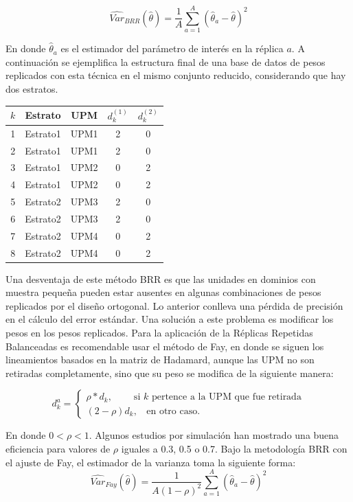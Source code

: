 \documentclass[
  12pt,
  spanish,
]{book}
\begin{document}
\[
\widehat{Var}_{BRR}(\hat{\theta}) = \frac{1}{A}\sum_{a=1}^A(\hat{\theta}_a - \hat\theta )^2
\]

En donde \(\hat{\theta}_a\) es el estimador del parámetro de interés en la réplica \(a\). A continuación se ejemplifica la estructura final de una base de datos de pesos replicados con esta técnica en el mismo conjunto reducido, considerando que hay dos estratos.

\begin{longtable}[]{@{}ccccc@{}}
\toprule
\(k\) & Estrato & UPM & \(d_k^{(1)}\) & \(d_k^{(2)}\) \\
\midrule
\endhead
1 & Estrato1 & UPM1 & 2 & 0 \\
2 & Estrato1 & UPM1 & 2 & 0 \\
3 & Estrato1 & UPM2 & 0 & 2 \\
4 & Estrato1 & UPM2 & 0 & 2 \\
5 & Estrato2 & UPM3 & 2 & 0 \\
6 & Estrato2 & UPM3 & 2 & 0 \\
7 & Estrato2 & UPM4 & 0 & 2 \\
8 & Estrato2 & UPM4 & 0 & 2 \\
\bottomrule
\end{longtable}

Una desventaja de este método BRR es que las unidades en dominios con muestra pequeña pueden estar ausentes en algunas combinaciones de pesos replicados por el diseño ortogonal. Lo anterior conlleva una pérdida de precisión en el cálculo del error estándar. Una solución a este problema es modificar los pesos en los pesos replicados. Para la aplicación de la Réplicas Repetidas Balanceadas es recomendable usar el método de Fay, en donde se siguen los lineamientos basados en la matriz de Hadamard, aunque las UPM no son retiradas completamente, sino que su peso se modifica de la siguiente manera:

\[
d_k^a=
\begin{cases}
\rho*d_k,\ \ \ \  \ \ \ \ \ \ \text{si $k$ pertence a la UPM que fue retirada} \\
(2-\rho)d_k, \ \ \ \ \text{en otro caso.}
\end{cases}
\]

En donde \(0<\rho<1\). Algunos estudios por simulación han mostrado una buena eficiencia para valores de \(\rho\) iguales a 0.3, 0.5 o 0.7. Bajo la metodología BRR con el ajuste de Fay, el estimador de la varianza toma la siguiente forma:
\[
\widehat{Var}_{Fay}(\hat{\theta}) = \frac{1}{A(1-\rho)^2}\sum_{a=1}^A(\hat{\theta}_a - \hat\theta )^2
\]
\end{document}
